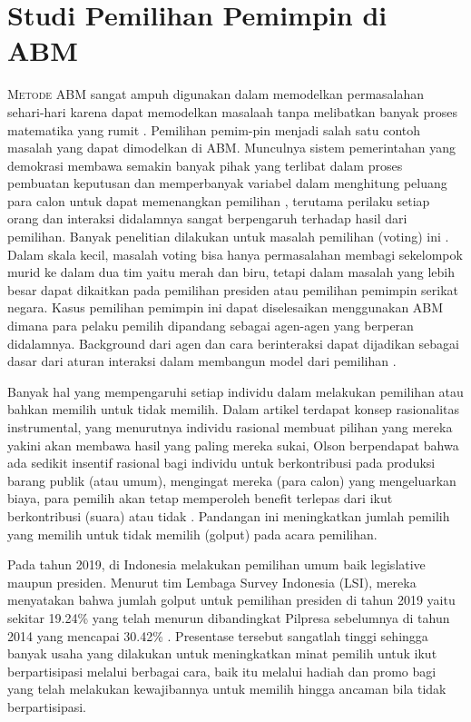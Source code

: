 \section{Studi Pemilihan Pemimpin di ABM}

\lettrine[nindent=-0.01em,findent=0.2em]{M}{etode} ABM sangat ampuh digunakan dalam memodelkan permasalahan sehari-hari karena dapat memodelkan masalaah tanpa melibatkan banyak proses matematika yang rumit \cite{crooks2018agent}. Pemilihan pemim-pin menjadi salah satu contoh masalah yang dapat dimodelkan di ABM. Munculnya sistem pemerintahan yang demokrasi membawa semakin banyak pihak yang terlibat dalam proses pembuatan keputusan dan memperbanyak variabel dalam menghitung peluang para calon untuk dapat memenangkan pemilihan \cite{feddersen2004rational}, terutama perilaku setiap orang dan interaksi didalamnya sangat berpengaruh terhadap hasil dari pemilihan. Banyak penelitian dilakukan untuk masalah pemilihan (voting) ini \cite{feddersen2004rational,saaty1989group}. Dalam skala kecil, masalah voting bisa hanya permasalahan membagi sekelompok murid ke dalam dua tim yaitu  merah dan biru, tetapi dalam masalah yang lebih besar dapat dikaitkan pada pemilihan presiden atau pemilihan pemimpin serikat negara. Kasus pemilihan pemimpin ini dapat diselesaikan menggunakan ABM dimana para pelaku pemilih dipandang sebagai agen-agen yang berperan didalamnya. Background dari agen dan cara berinteraksi dapat dijadikan sebagai dasar  dari aturan interaksi dalam membangun model dari pemilihan \cite{kazil2020utilizing}.

Banyak hal yang mempengaruhi setiap individu dalam melakukan pemilihan atau bahkan memilih untuk tidak memilih. Dalam artikel \cite{olson2012logic} terdapat konsep rasionalitas instrumental, yang menurutnya individu rasional membuat pilihan yang mereka yakini akan membawa hasil yang paling mereka sukai, Olson berpendapat bahwa ada sedikit insentif rasional bagi individu untuk berkontribusi pada produksi barang publik (atau umum), mengingat mereka (para calon) yang mengeluarkan biaya, para pemilih akan tetap memperoleh benefit terlepas dari ikut berkontribusi (suara) atau tidak \cite{savigny_2014}. Pandangan ini meningkatkan jumlah pemilih yang memilih untuk tidak memilih (golput) pada acara pemilihan.

Pada tahun 2019, di Indonesia melakukan pemilihan umum baik legislative maupun presiden. Menurut tim Lembaga Survey Indonesia (LSI), mereka menyatakan bahwa jumlah golput untuk pemilihan presiden di tahun 2019 yaitu sekitar 19.24\% yang telah menurun dibandingkat Pilpresa sebelumnya di tahun 2014 yang mencapai 30.42\% \cite{bbc_2019}. Presentase tersebut sangatlah tinggi sehingga banyak usaha yang dilakukan untuk meningkatkan minat pemilih untuk ikut berpartisipasi melalui berbagai cara, baik itu melalui hadiah dan promo bagi yang telah melakukan kewajibannya untuk memilih hingga ancaman bila tidak berpartisipasi.


